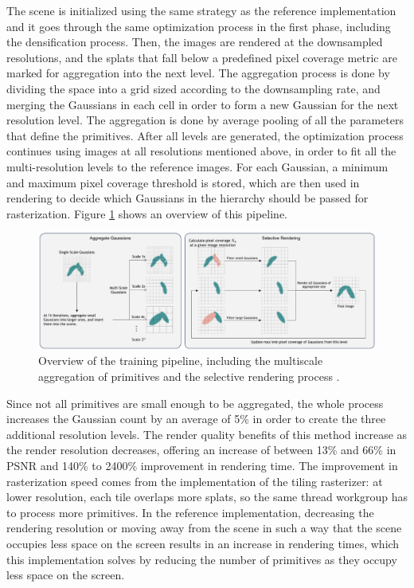 The scene is initialized using the same strategy as the reference implementation and it goes through the same optimization process in the first phase, including the densification process. Then, the images are rendered at the downsampled resolutions, and the splats that fall below a predefined pixel coverage metric are marked for aggregation into the next level. The aggregation process is done by dividing the space into a grid sized according to the downsampling rate, and merging the Gaussians in each cell in order to form a new Gaussian for the next resolution level. The aggregation is done by average pooling of all the parameters that define the primitives. After all levels are generated, the optimization process continues using images at all resolutions mentioned above, in order to fit all the multi-resolution levels to the reference images.
For each Gaussian, a minimum and maximum pixel coverage threshold is stored, which are then used in rendering to decide which Gaussians in the hierarchy should be passed for rasterization. Figure \ref{fig:multiscale_aggregate} shows an overview of this pipeline.

\begin{figure}[H]
    \centering
    \includegraphics[width=0.8\linewidth]{figures/multiscale_gaussian.png}
    \caption{Overview of the training pipeline, including the multiscale aggregation of primitives and the selective rendering process \cite{yan2024multiscale3dgaussiansplatting}.}
    \label{fig:multiscale_aggregate}
\end{figure}

Since not all primitives are small enough to be aggregated, the whole process increases the Gaussian count by an average of 5\% in order to create the three additional resolution levels. The render quality benefits of this method increase as the render resolution decreases, offering an increase of between 13\% and 66\% in PSNR and 140\% to 2400\% improvement in rendering time. The improvement in rasterization speed comes from the implementation of the tiling rasterizer: at lower resolution, each tile overlaps more splats, so the same thread workgroup has to process more primitives. In the reference implementation, decreasing the rendering resolution or moving away from the scene in such a way that the scene occupies less space on the screen results in an increase in rendering times, which this implementation solves by reducing the number of primitives as they occupy less space on the screen. 


